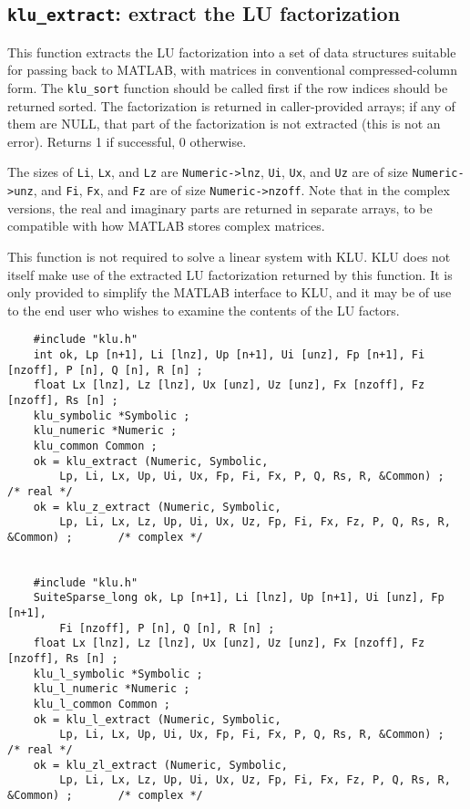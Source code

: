 \documentclass[11pt]{article}
\begin{document}
\subsection{{\tt klu\_extract}: extract the LU factorization}

This function extracts the LU factorization into a set of data structures
suitable for passing back to MATLAB, with matrices in conventional
compressed-column form.  The {\tt klu\_sort} function should be called first if
the row indices should be returned sorted.  The factorization is returned in
caller-provided arrays; if any of them are NULL, that part of the factorization
is not extracted (this is not an error).  Returns 1 if successful, 0 otherwise.

The sizes of {\tt Li}, {\tt Lx}, and {\tt Lz} are {\tt Numeric->lnz},
{\tt Ui}, {\tt Ux}, and {\tt Uz} are of size {\tt Numeric->unz}, and
{\tt Fi}, {\tt Fx}, and {\tt Fz} are of size {\tt Numeric->nzoff}.
Note that in the complex versions, the real and imaginary parts are returned
in separate arrays, to be compatible with how MATLAB stores complex matrices.

This function is not required to solve a linear system with KLU.  KLU does not
itself make use of the extracted LU factorization returned by this function.
It is only provided to simplify the MATLAB interface to KLU, and it may be of
use to the end user who wishes to examine the contents of the LU factors.

{\footnotesize
\begin{verbatim}
    #include "klu.h"
    int ok, Lp [n+1], Li [lnz], Up [n+1], Ui [unz], Fp [n+1], Fi [nzoff], P [n], Q [n], R [n] ;
    float Lx [lnz], Lz [lnz], Ux [unz], Uz [unz], Fx [nzoff], Fz [nzoff], Rs [n] ;
    klu_symbolic *Symbolic ;
    klu_numeric *Numeric ;
    klu_common Common ;
    ok = klu_extract (Numeric, Symbolic,
        Lp, Li, Lx, Up, Ui, Ux, Fp, Fi, Fx, P, Q, Rs, R, &Common) ;                   /* real */
    ok = klu_z_extract (Numeric, Symbolic,
        Lp, Li, Lx, Lz, Up, Ui, Ux, Uz, Fp, Fi, Fx, Fz, P, Q, Rs, R, &Common) ;       /* complex */


    #include "klu.h"
    SuiteSparse_long ok, Lp [n+1], Li [lnz], Up [n+1], Ui [unz], Fp [n+1],
        Fi [nzoff], P [n], Q [n], R [n] ;
    float Lx [lnz], Lz [lnz], Ux [unz], Uz [unz], Fx [nzoff], Fz [nzoff], Rs [n] ;
    klu_l_symbolic *Symbolic ;
    klu_l_numeric *Numeric ;
    klu_l_common Common ;
    ok = klu_l_extract (Numeric, Symbolic,
        Lp, Li, Lx, Up, Ui, Ux, Fp, Fi, Fx, P, Q, Rs, R, &Common) ;                   /* real */
    ok = klu_zl_extract (Numeric, Symbolic,
        Lp, Li, Lx, Lz, Up, Ui, Ux, Uz, Fp, Fi, Fx, Fz, P, Q, Rs, R, &Common) ;       /* complex */
\end{verbatim}
}
\end{document}
